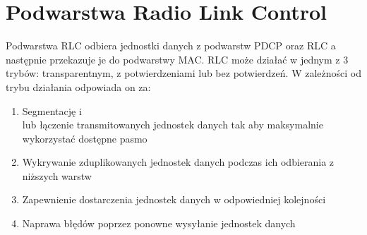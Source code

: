 \chapter{Podwarstwa Radio Link Control}
\label{cha:rlc}

Podwarstwa RLC odbiera jednostki danych z podwarstw PDCP oraz RLC a następnie przekazuje je do podwarstwy MAC. RLC może działać w jednym z 3 trybów: transparentnym, z potwierdzeniami lub bez potwierdzeń. W zależności od trybu działania odpowiada on za:

\begin{enumerate}
	\item Segmentację i\\lub łączenie transmitowanych jednostek danych tak aby maksymalnie wykorzystać dostępne pasmo
	\item Wykrywanie zduplikowanych jednostek danych podczas ich odbierania z niższych warstw
	\item Zapewnienie dostarczenia jednostek danych w odpowiedniej kolejności
	\item Naprawa błędów poprzez ponowne wysyłanie jednostek danych
\end{enumerate}
